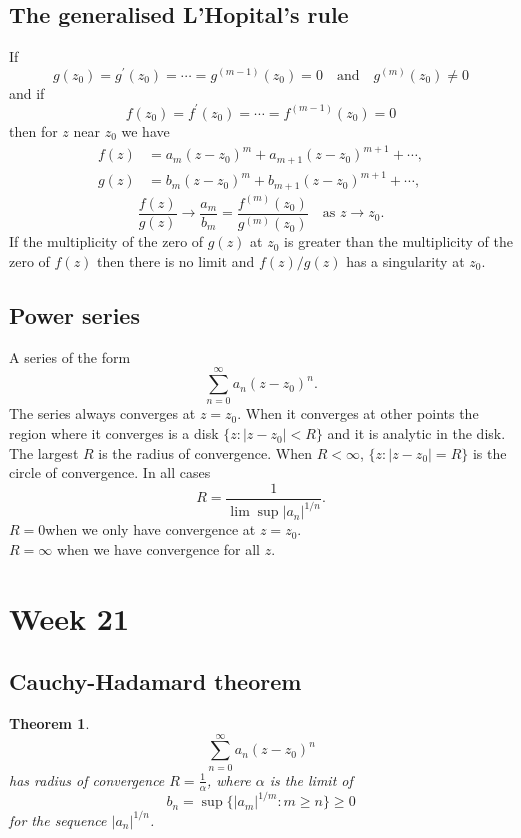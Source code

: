 \documentclass{article}
\newtheorem{theorem}{Theorem}
\begin{document}
\subsection{The generalised L'Hopital's rule}
If
\begin{equation}
    g(z_0) = g^\prime(z_0) = \cdots = g^{(m-1)}(z_0) = 0\quad \text{and}\quad g^{(m)}(z_0)\neq 0
\end{equation}
and if
\begin{equation}
    f(z_0) = f^\prime(z_0) = \cdots = f^{(m-1)}(z_0) = 0
\end{equation}
then for $z$ near $z_0$ we have
\begin{align}
    f(z) &= a_m(z-z_0)^m + a_{m+1}(z-z_0)^{m+1} + \cdots, \\
    g(z) &= b_m(z-z_0)^m + b_{m+1}(z-z_0)^{m+1} + \cdots,
\end{align}
\begin{equation}
    \frac{f(z)}{g(z)}\to\frac{a_m}{b_m} = \frac{f^{(m)}(z_0)}{g^{(m)}(z_0)}\quad\text{as }z\to z_0.
\end{equation}
If the multiplicity of the zero of $g(z)$ at $z_0$ is greater than the multiplicity of the zero of $f(z)$ then there is no limit and $f(z)/g(z)$ has a singularity at $z_0$.


\subsection{Power series}
A series of the form
\begin{equation}
    \sum_{n=0}^\infty a_n(z-z_0)^n.
\end{equation}
The series always converges at $z=z_0$. When it converges at other points the region where it converges is a disk $\{ z:\vert z-z_0\vert<R \}$ and it is analytic in the disk.\\
The largest $R$ is the radius of convergence. When $R<\infty$, $\{ z:\vert z-z_0\vert = R \}$ is the circle of convergence. In all cases
\begin{equation}
    R = \frac{1}{\lim \sup \vert a_n\vert^{1/n}}.
\end{equation}
$R = 0$when we only have convergence at $z=z_0$. \\
$R = \infty$ when we have convergence for all $z$.


\section{Week 21}
\subsection{Cauchy-Hadamard theorem}
\begin{theorem}
    \begin{equation}
        \sum_{n=0}^\infty a_n(z-z_0)^n
    \end{equation}
    has radius of convergence $R=\frac{1}{\alpha}$, where $\alpha$ is the limit of
    \begin{equation}
        b_n = \sup \{ \vert a_m\vert^{1/m} : m\geq n \}\geq 0
    \end{equation}
    for the sequence $\vert a_n\vert^{1/n}$.
\end{theorem}
\end{document}
